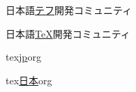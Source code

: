 \documentclass{article}
\begin{document}
日本語\underline{テフ}開発コミュニティ\par
日本語\underline{\TeX}開発コミュニティ\par %
tex\underline{jp}org\par
tex\underline{日本}org\par %
\end{document}
